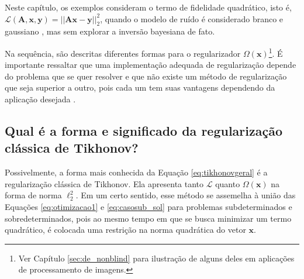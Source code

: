 Neste capítulo, os exemplos consideram o termo de fidelidade quadrático, isto é, $\mathcal{L} \left(\mathbf{A}, \mathbf{x}, \mathbf{y} \right) = \vert \vert \mathbf{A} \mathbf{x} - \mathbf{y} \vert \vert^2_2$, quando o modelo de ruído é considerado branco e gaussiano \cite[Exemplo 5]{kaipio2005statistical}, mas sem explorar a inversão bayesiana de fato. 

Na sequência, são descritas diferentes formas para o regularizador $\Omega(\mathbf{x})$\footnote{Ver Capítulo \ref{sec:de_nonblind} para ilustração de alguns deles em aplicações de processamento de imagens.}. É importante ressaltar que uma implementação adequada de regularização depende do problema que se quer resolver \cite[pág. 192]{hansen2010discrete} e que não existe um método de regularização que seja superior a outro, pois cada um tem suas vantagens dependendo da aplicação desejada \cite[pág. 2]{Hansen1998}.

\subsection{Qual é a forma e significado da regularização clássica de Tikhonov?}\label{sec:tikhclas}

Possivelmente, a forma mais conhecida da Equação \eqref{eq:tikhonovgeral} é a regularização clássica de Tikhonov.  Ela apresenta tanto $\mathcal{L}$ quanto $\Omega(\mathbf{x})$ na forma de norma $\ell_2^2$. Em um certo sentido, esse método se assemelha à união das  Equações \eqref{eq:otimizacao1} e \eqref{eq:casosub_sol} para problemas subdeterminados e sobredeterminados, pois ao mesmo tempo em que se busca minimizar um termo quadrático, é colocada uma restrição na norma quadrática do vetor $\mathbf{x}$. 

